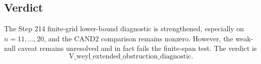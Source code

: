 \documentclass[11pt]{article}
\begin{document}
\subsection*{Verdict}

The Step 214 finite-grid lower-bound diagnostic is strengthened, especially on \(n=11,\dots,20\), and the CAND2 comparison remains nonzero.  However, the weak-null caveat remains unresolved and in fact fails the finite-span test.  The verdict is
\[
  \boxed{\mathrm{V\_weyl\_extended\_obstruction\_diagnostic}}.
\]
\end{document}

